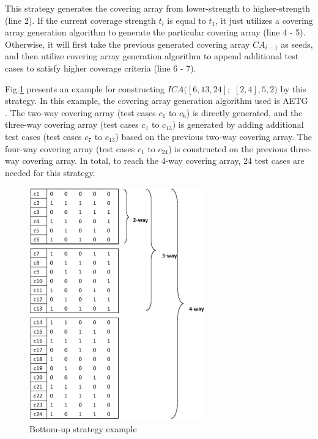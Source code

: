 \documentclass[conference]{IEEEtran}
\theoremstyle{definition}
\begin{document}
This strategy generates the covering array from lower-strength to higher-strength (line 2). If the current coverage strength $t_{i}$ is equal to $t_{1}$, it just utilizes a covering array generation algorithm to generate the particular covering array (line 4 - 5). Otherwise, it will first take the previous generated covering array $CA_{i - 1}$ as seeds, and then utilize covering array generation algorithm to append additional test cases to satisfy higher coverage criteria (line 6 - 7).
%

Fig.\ref{increase-example} presents an example for constructing $ICA([6,13,24];$ $  [2,4], 5, 2)$ by this strategy. In this example, the covering array generation algorithm used is AETG \cite{cohen1997aetg}. The two-way covering array (test cases $c_{1}$ to $c_{6}$) is directly generated, and the three-way covering array (test cases $c_{1}$ to $ c_{13}$) is generated by adding additional test cases (test cases $c_{7}$ to $c_{13}$) based on the previous two-way covering array. The four-way covering array (test cases $c_{1}$ to $c_{24}$) is constructed on the previous three-way covering array. In total, to reach the 4-way covering array, 24 test cases are needed for this strategy.
\begin{figure}
\center
 \includegraphics[width=3.0in]{increase_example.eps}
\caption{Bottom-up strategy example}
\label{increase-example}
\end{figure}
\end{document}
